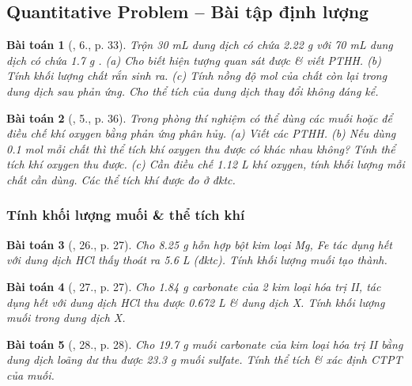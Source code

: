 \documentclass{article}
\newtheorem{baitoan}{Bài toán}
\begin{document}
\subsection{Quantitative Problem -- Bài tập định lượng}

\begin{baitoan}[\cite{SGK_Hoa_Hoc_9}, 6., p. 33]
	Trộn \emph{30 mL} dung dịch có chứa \emph{2.22 g } với \emph{70 mL} dung dịch có chứa \emph{1.7 g }. (a) Cho biết hiện tượng quan sát được \& viết PTHH. (b) Tính khối lượng chất rắn sinh ra. (c) Tính nồng độ mol của chất còn lại trong dung dịch sau phản ứng. Cho thể tích của dung dịch thay đổi không đáng kể.
\end{baitoan}

\begin{baitoan}[\cite{SGK_Hoa_Hoc_9}, 5., p. 36]
	Trong phòng thí nghiệm có thể dùng các muối \emph{} hoặc \emph{} để điều chế khí oxygen bằng phản ứng phân hủy. (a) Viết các PTHH. (b) Nếu dùng \emph{0.1 mol} mỗi chất thì thể tích khí oxygen thu được có khác nhau không? Tính thể tích khí oxygen thu được. (c) Cần điều chế \emph{1.12 L} khí oxygen, tính khối lượng mỗi chất cần dùng. Các thể tích khí được đo ở đktc.
\end{baitoan}

\subsubsection{Tính khối lượng muối \& thể tích khí }

\begin{baitoan}[\cite{An_350_BT_Hoa_Hoc_9}, 26., p. 27]
	Cho \emph{8.25 g} hỗn hợp bột kim loại \emph{Mg, Fe} tác dụng hết với dung dịch \emph{HCl} thấy thoát ra \emph{5.6 L } (đktc). Tính khối lượng muối tạo thành.
\end{baitoan}

\begin{baitoan}[\cite{An_350_BT_Hoa_Hoc_9}, 27., p. 27]
	Cho \emph{1.84 g} carbonate của 2 kim loại hóa trị II, tác dụng hết với dung dịch \emph{HCl} thu được \emph{0.672 L } \& dung dịch X. Tính khối lượng muối trong dung dịch X.
\end{baitoan}

\begin{baitoan}[\cite{An_350_BT_Hoa_Hoc_9}, 28., p. 28]
	Cho \emph{19.7 g} muối carbonate của kim loại hóa trị II bằng dung dịch \emph{} loãng dư thu được \emph{23.3 g} muối sulfate. Tính thể tích \emph{} \& xác định CTPT của muối.
\end{baitoan}
\end{document}
